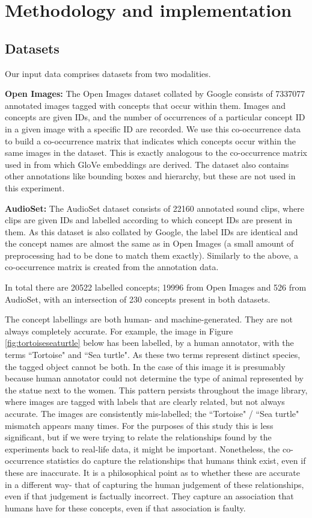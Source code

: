 
\chapter{Methodology and implementation}

\section{Datasets}

Our input data comprises datasets from two modalities. 

\textbf{Open Images:} The Open Images dataset \cite{openimages} collated by Google consists of 7337077 annotated images tagged with concepts that occur within them. Images and concepts are given IDs, and the number of occurrences of a particular concept ID in a given image with a specific ID are recorded. We use this co-occurrence data to build a co-occurrence matrix that indicates which concepts occur within the same images in the dataset. This is exactly analogous to the co-occurrence matrix used in \cite{pennington2014glove} from which GloVe embeddings are derived. The dataset also contains other annotations like bounding boxes and hierarchy, but these are not used in this experiment.

\textbf{AudioSet:} The AudioSet dataset \cite{audioset} consists of 22160 annotated sound clips, where clips are given IDs and labelled according to which concept IDs are present in them. As this dataset is also collated by Google, the label IDs are identical and the concept names are almost the same as in Open Images (a small amount of preprocessing had to be done to match them exactly). Similarly to the above, a co-occurrence matrix is created from the annotation data. 

In total there are 20522 labelled concepts; 19996 from Open Images and 526 from AudioSet, with an intersection of 230 concepts present in both datasets. 

The concept labellings are both human- and machine-generated. They are not always completely accurate. For example, the image in Figure \ref{fig:tortoiseseaturtle} below has been labelled, by a human annotator, with the terms ``Tortoise" and ``Sea turtle". As these two terms represent distinct species, the tagged object cannot be both. In the case of this image it is presumably because human annotator could not determine the type of animal represented by the statue next to the women. This pattern persists throughout the image library, where images are tagged with labels that are clearly related, but not always accurate. The images are consistently mis-labelled; the ``Tortoise" / ``Sea turtle" mismatch appears many times. For the purposes of this study this is less significant, but if we were trying to relate the relationships found by the experiments back to real-life data, it might be important. Nonetheless, the co-occurrence statistics do capture the relationships that humans think exist, even if these are inaccurate. It is a philosophical point as to whether these are accurate in a different way- that of capturing the human judgement of these relationships, even if that judgement is factually incorrect. They capture an association that humans have for these concepts, even if that association is faulty. 

